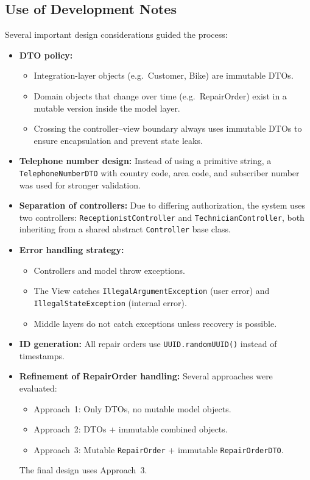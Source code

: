 \documentclass[a4paper]{scrartcl}
\begin{document}
\subsection{Use of Development Notes}
Several important design considerations guided the process:
\begin{itemize}
  \item \textbf{DTO policy:}
    \begin{itemize}
      \item Integration-layer objects (e.g.\ Customer, Bike) are immutable DTOs.
      \item Domain objects that change over time (e.g.\ RepairOrder) exist in a 
      mutable version inside the model layer.
      \item Crossing the controller--view boundary always uses immutable DTOs 
      to ensure encapsulation and prevent state leaks.
    \end{itemize}

  \item \textbf{Telephone number design:} Instead of using a primitive string, a 
        \texttt{TelephoneNumberDTO} with country code, area code, and subscriber 
        number was used for stronger validation.

  \item \textbf{Separation of controllers:} Due to differing authorization, 
        the system uses two controllers:
        \texttt{ReceptionistController} and \texttt{TechnicianController},
        both inheriting from a shared abstract \texttt{Controller} base class.

  \item \textbf{Error handling strategy:}
    \begin{itemize}
      \item Controllers and model throw exceptions.
      \item The View catches \texttt{IllegalArgumentException} (user error) and
            \texttt{IllegalStateException} (internal error).
      \item Middle layers do not catch exceptions unless recovery is possible.
    \end{itemize}

  \item \textbf{ID generation:} All repair orders use 
        \texttt{UUID.randomUUID()} instead of timestamps.

  \item \textbf{Refinement of RepairOrder handling:}
    Several approaches were evaluated:
    \begin{itemize}
      \item Approach~1: Only DTOs, no mutable model objects.
      \item Approach~2: DTOs + immutable combined objects.
      \item Approach~3: Mutable \texttt{RepairOrder} + immutable \texttt{RepairOrderDTO}.
    \end{itemize}
    The final design uses Approach~3.
\end{itemize}
\end{document}
